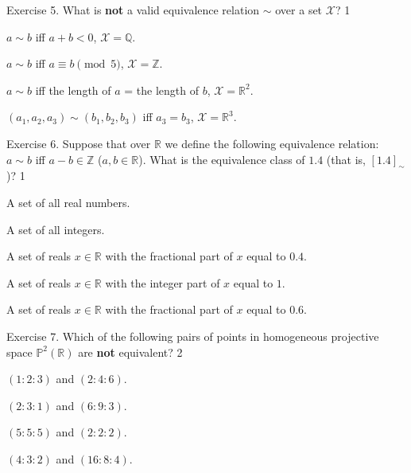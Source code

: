 \documentclass[../lecture-notes-148x210.tex]{subfiles}
\begin{document}
\begin{xexercise}
    {Exercise 5.}
    {What is \textbf{not} a valid equivalence relation $\sim$ over a set $\mathcal{X}$?}
    {1}
    {
        \item $a \sim b$ iff $a+b < 0$, $\mathcal{X} = \mathbb{Q}$.
        \item $a\sim b$ iff $a \equiv b \pmod{5}$, $\mathcal{X} = \mathbb{Z}$.
        \item $a\sim b$ iff the length of $a$ = the length of $b$, $\mathcal{X} = \mathbb{R}^2$.
        \item $(a_1,a_2,a_3)\sim (b_1,b_2,b_3)$ iff $a_3=b_3$, $\mathcal{X} = \mathbb{R}^3$.
    }
\end{xexercise}

\begin{xexercise}
    {Exercise 6.}
    {Suppose that over $\mathbb{R}$ we define the following equivalence relation: $a \sim b$ iff $a-b \in \mathbb{Z}$ ($a,b \in \mathbb{R}$). What is the equivalence class of $1.4$ (that is, $[1.4]_{\sim}$)?}
    {1}
    {
        \item A set of all real numbers.
        \item A set of all integers.
        \item A set of reals $x \in \mathbb{R}$ with the fractional part of $x$ equal to $0.4$.
        \item A set of reals $x \in \mathbb{R}$ with the integer part of $x$ equal to $1$.
        \item A set of reals $x \in \mathbb{R}$ with the fractional part of $x$ equal to $0.6$.
    }
\end{xexercise}

\begin{xexercise}
    {Exercise 7.}
    {Which of the following pairs of points in homogeneous projective space $\mathbb{P}^2(\mathbb{R})$ are \textbf{not} equivalent?}
    {2}
    {
        \item $(1:2:3)$ and $(2:4:6)$.
        \item $(2:3:1)$ and $(6:9:3)$.
        \item $(5:5:5)$ and $(2:2:2)$.
        \item $(4:3:2)$ and $(16:8:4)$.
    }
\end{xexercise}
\end{document}

